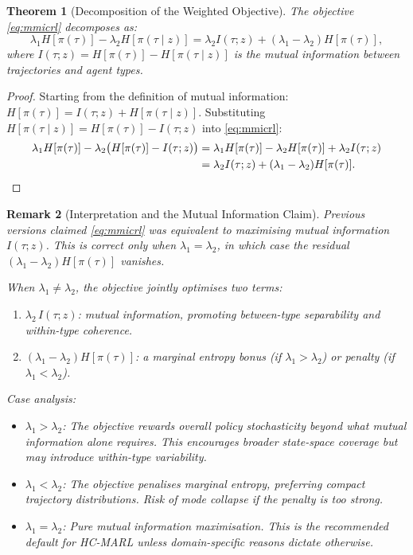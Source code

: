\documentclass[11pt,a4paper]{article}
\newtheorem{theorem}{Theorem}[section]
\newtheorem{remark}[theorem]{Remark}
\begin{document}
\begin{theorem}[Decomposition of the Weighted Objective]\label{thm:mmicrl-decomp}
The objective \eqref{eq:mmicrl} decomposes as:
\begin{equation}\label{eq:mmicrl-decomp}
\lambda_1 H[\pi(\tau)] - \lambda_2 H[\pi(\tau \mid z)] = \lambda_2 I(\tau; z) + (\lambda_1 - \lambda_2) H[\pi(\tau)],
\end{equation}
where $I(\tau; z) = H[\pi(\tau)] - H[\pi(\tau \mid z)]$ is the mutual
information between trajectories and agent types.
\end{theorem}

\begin{proof}
Starting from the definition of mutual information:
$H[\pi(\tau)] = I(\tau; z) + H[\pi(\tau \mid z)]$.
Substituting $H[\pi(\tau \mid z)] = H[\pi(\tau)] - I(\tau; z)$ into
\eqref{eq:mmicrl}:
\begin{align*}
\lambda_1 H[\pi(\tau)] - \lambda_2 \bigl(H[\pi(\tau)] - I(\tau; z)\bigr)
&= \lambda_1 H[\pi(\tau)] - \lambda_2 H[\pi(\tau)] + \lambda_2 I(\tau; z) \\
&= \lambda_2 I(\tau; z) + (\lambda_1 - \lambda_2) H[\pi(\tau)]. \qedhere
\end{align*}
\end{proof}

\begin{remark}[Interpretation and the Mutual Information Claim]
Previous versions claimed \eqref{eq:mmicrl} was equivalent to
maximising mutual information $I(\tau; z)$. This is correct
\emph{only when} $\lambda_1 = \lambda_2$, in which case the residual
$(\lambda_1 - \lambda_2) H[\pi(\tau)]$ vanishes.

When $\lambda_1 \neq \lambda_2$, the objective jointly optimises two
terms:
\begin{enumerate}[noitemsep]
\item $\lambda_2\, I(\tau; z)$: mutual information, promoting between-type separability and within-type coherence.
\item $(\lambda_1 - \lambda_2) H[\pi(\tau)]$: a marginal entropy bonus (if $\lambda_1 > \lambda_2$) or penalty (if $\lambda_1 < \lambda_2$).
\end{enumerate}

\textit{Case analysis:}
\begin{itemize}[noitemsep]
\item $\lambda_1 > \lambda_2$: The objective rewards overall policy stochasticity beyond what mutual information alone requires. This encourages broader state-space coverage but may introduce within-type variability.
\item $\lambda_1 < \lambda_2$: The objective penalises marginal entropy, preferring compact trajectory distributions. Risk of mode collapse if the penalty is too strong.
\item $\lambda_1 = \lambda_2$: Pure mutual information maximisation. This is the recommended default for HC-MARL unless domain-specific reasons dictate otherwise.
\end{itemize}
\end{remark}
\end{document}
